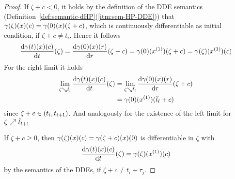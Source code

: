 \begin{proof}
        If $\zeta+c<0$, it holds by the definition of the DDE semantics (Definition~\ref{def:semantic-dHP}(\ref{itm:sem-HP-DDE})) that $\gamma(\zeta)(x)(c)=\gamma(0)(x)(\zeta+c)$, which is continuously differentiable as initial condition, if $\zeta+c\neq t_i$. Hence it follows
        \begin{equation*}
            \DD{\trajectory(t)(x)(c)}{t}(\zeta)=\DD{\trajectory(0)(x)(\past)}{\past}(\zeta+c)=\trajectory(0)(\D{x})(\zeta+c)=\trajectory(\zeta)(\D{x})(c)
        \end{equation*}
        For the right limit it holds
        \begin{align*}
            \lim_{\zeta\downto\hat{t}_l} \DD{\trajectory(t)(x)(c)}{t}(\zeta)
                & = \lim_{\zeta\downto \hat{t}_l} \DD{\trajectory(0)(x)(\past)}{\past}(\zeta+c)\\
                &
                = \trajectory(0)(\D{x})(\hat{t}_l+c)
        \end{align*}
        since $\zeta+c\in(t_i,t_{i+1})$.
        And analogously for the existence of the left limit for $\zeta\nearrow\hat{t}_{l+1}$

        If $\zeta+c\geq 0$, then $\gamma(\zeta)(x)(c)=\gamma(\zeta+c)(x)(0)$ is differentiable in $\zeta$ with
        \begin{equation*}
            \DD{\trajectory(t)(x)(c)}{t}(\zeta) = \trajectory(\zeta)(\D{x})(c)
        \end{equation*}
        by the semantics of the DDEs, if $\zeta+c\neq t_i+\tau_j$.




\end{proof}
